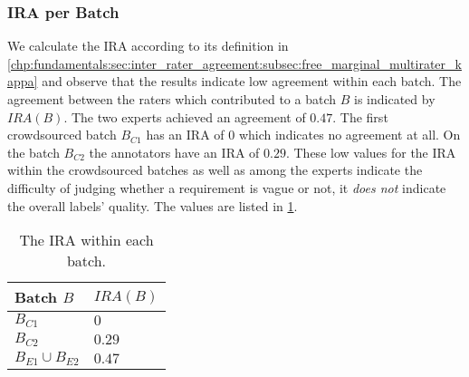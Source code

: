 \subsubsection{\Ac{IRA} per Batch}
We calculate the \ac{IRA} according to its definition in \cref{chp:fundamentals:sec:inter_rater_agreement:subsec:free_marginal_multirater_kappa} and observe that the results indicate low agreement within each batch.
The agreement between the raters which contributed to a batch $B$ is indicated by $IRA(B)$.
The two experts achieved an agreement of $0.47$.
The first crowdsourced batch $B_{C1}$ has an \ac{IRA} of $0$ which indicates no agreement at all.
On the batch $B_{C2}$ the annotators have an \ac{IRA} of $0.29$.
These low values for the \ac{IRA} within the crowdsourced batches as well as among the experts indicate the difficulty of judging whether a requirement is vague or not, it \textit{does not} indicate the overall labels' quality.
The values are listed in \cref{tab:study:objects:crowdsourcing:batches:IRA}.
\begin{table}[htpb]
    \centering
    \begin{tabular}{l l}
        \toprule
        Batch $B$ & $IRA(B)$ \\
        \midrule
        $B_{C1}$ & $0$\\
        $B_{C2}$ & $0.29$\\
        $B_{E1} \cup B_{E2}$ & $0.47$ \\
        \bottomrule
    \end{tabular}
    \caption[Inter rater agreement within the batches]{The \ac{IRA} within each batch.}\label{tab:study:objects:crowdsourcing:batches:IRA}
\end{table}

